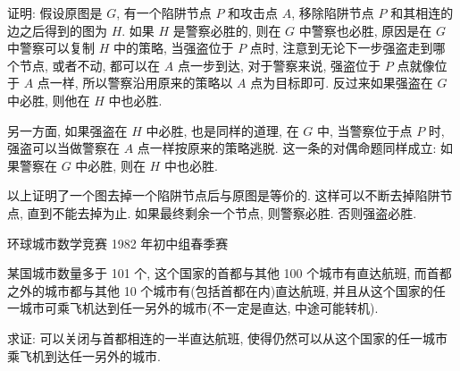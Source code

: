 证明: 假设原图是 $ G $, 有一个陷阱节点 $ P $ 和攻击点 $ A $, 移除陷阱节点 $ P $ 和其相连的边之后得到的图为 $ H $. 如果 $ H $ 是警察必胜的, 则在 $ G $ 中警察也必胜, 原因是在 $ G $ 中警察可以复制 $ H $ 中的策略, 当强盗位于 $ P $ 点时, 注意到无论下一步强盗走到哪个节点, 或者不动, 都可以在 $ A $ 点一步到达, 对于警察来说, 强盗位于 $ P $ 点就像位于 $ A $ 点一样, 所以警察沿用原来的策略以 $ A $ 点为目标即可. 反过来如果强盗在 $ G $ 中必胜, 则他在 $ H $ 中也必胜. 

另一方面, 如果强盗在 $ H $ 中必胜, 也是同样的道理, 在 $ G $ 中, 当警察位于点 $ P $ 时, 强盗可以当做警察在
$ A $ 点一样按原来的策略逃脱. 这一条的对偶命题同样成立: 如果警察在 $ G $ 中必胜, 则在 $ H $ 中也必胜.

以上证明了一个图去掉一个陷阱节点后与原图是等价的. 这样可以不断去掉陷阱节点, 直到不能去掉为止. 如果最终剩余一个节点, 则警察必胜. 否则强盗必胜.

\newpage
\noindent 环球城市数学竞赛 1982 年初中组春季赛

某国城市数量多于 101 个, 这个国家的首都与其他 100 个城市有直达航班, 而首都之外的城市都与其他 10 个城市有(包括首都在内)直达航班, 并且从这个国家的任一城市可乘飞机达到任一另外的城市(不一定是直达, 中途可能转机). 

求证: 可以关闭与首都相连的一半直达航班, 使得仍然可以从这个国家的任一城市乘飞机到达任一另外的城市.

~

